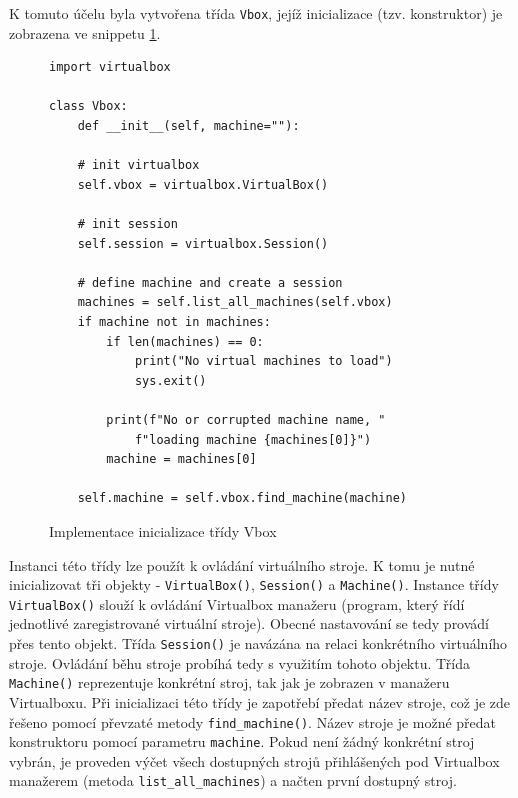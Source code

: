 \documentclass[thesis=M,czech,hidelinks]{FITthesis}[2013/05/06]
\begin{document}
K tomuto účelu byla vytvořena třída  \texttt{Vbox}, jejíž inicializace (tzv. konstruktor) je zobrazena ve snippetu \ref{snip:vboxmain}.
\begin{figure}[h]               
	\begin{verbatim}
import virtualbox

class Vbox:
    def __init__(self, machine=""):

    # init virtualbox
    self.vbox = virtualbox.VirtualBox()

    # init session
    self.session = virtualbox.Session()

    # define machine and create a session
    machines = self.list_all_machines(self.vbox)
    if machine not in machines:
        if len(machines) == 0:
            print("No virtual machines to load")
            sys.exit()

        print(f"No or corrupted machine name, "
            f"loading machine {machines[0]}")
        machine = machines[0]

    self.machine = self.vbox.find_machine(machine)
	\end{verbatim}      
	\caption{Implementace inicializace třídy Vbox}
	\label{snip:vboxmain}
\end{figure}
Instanci této třídy lze použít k ovládání virtuálního stroje. K tomu je nutné inicializovat tři objekty - \texttt{VirtualBox()}, \texttt{Session()} a \texttt{Machine()}. Instance třídy \texttt{VirtualBox()} slouží k ovládání Virtualbox manažeru (program, který řídí jednotlivé zaregistrované virtuální stroje). Obecné nastavování se tedy provádí přes tento objekt. Třída \texttt{Session()} je navázána na relaci konkrétního virtuálního stroje. Ovládání běhu stroje probíhá tedy s využitím tohoto objektu. Třída \texttt{Machine()} reprezentuje konkrétní stroj, tak jak je zobrazen v manažeru Virtualboxu. Při inicializaci této třídy je zapotřebí předat název stroje, což je zde řešeno pomocí převzaté metody \texttt{find_machine()}. Název stroje je možné předat konstruktoru pomocí parametru \texttt{machine}. Pokud není žádný konkrétní stroj vybrán, je proveden výčet všech dostupných strojů přihlášených pod Virtualbox manažerem (metoda \texttt{list_all_machines}) a načten první dostupný stroj.
\end{document}
